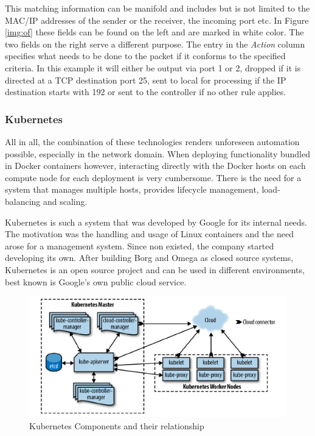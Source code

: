 This matching information can be manifold and includes but is not limited to the MAC/IP addresses of the sender or the receiver, the incoming port etc. In Figure \ref{img:of} these fields can be found on the left and are marked in white color. The two fields on the right serve a different purpose. The entry in the \textit{Action} column specifies what needs to be done to the packet if it conforms to the specified criteria. In this example it will either be output via port 1 or 2, dropped if it is directed at a TCP destination port 25, sent to local for processing if the IP destination starts with 192 or sent to the controller if no other rule applies. 

\subsubsection{Kubernetes}

All in all, the combination of these technologies renders unforeseen automation possible, especially in the network domain. When deploying functionality bundled in Docker containers however, interacting directly with the Docker hosts on each compute node for each deployment is very cumbersome. There is the need for a system that manages multiple hosts, provides lifecycle management, load-balancing and scaling. 

Kubernetes is such a system that was developed by Google for its internal needs. The motivation was the handling and usage of Linux containers and the need arose for a management system. Since non existed, the company started developing its own. After building Borg and Omega as closed source systems, Kubernetes is an open source project and can be used in different environments, best known is Google's own public cloud service. 

\begin{figure}[h]
	\includegraphics[width=\linewidth]{images/k8Arch.png}
	\caption{Kubernetes Components and their relationship \cite{k8CN}}
	\label{fig:k8}
\end{figure}

